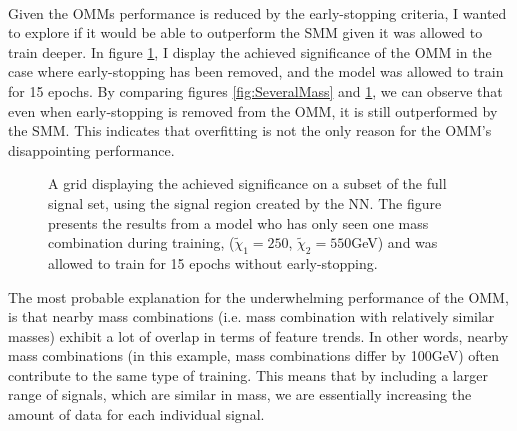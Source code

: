 \\
Given the \ac{OMM}s performance is reduced by the early-stopping criteria, I wanted to explore if it would be able to outperform the 
\ac{SMM} given it was allowed to train deeper. In figure \ref{fig:NNOverfitting}, I display the achieved significance
of the \ac{OMM} in the case where early-stopping has been removed, and the model was allowed to train for 15 epochs. By comparing figures 
\ref{fig:SeveralMass} and \ref{fig:NNOverfitting}, we can observe that even when early-stopping is removed from the \ac{OMM}, it is  
still outperformed by the \ac{SMM}. This indicates that overfitting is not the only reason for the \ac{OMM}'s disappointing performance.\\
\begin{figure}
    \centering
    \caption{A grid displaying the achieved significance on a subset of the full signal set, using the signal region 
    created by the \ac{NN}. The figure presents the results from a model who has only seen one mass combination 
    during training, ($\tilde{\chi}_1=250$, $\tilde{\chi}_2=550$GeV) and was allowed to train for 15 epochs without 
    early-stopping.}
    \label{fig:NNOverfitting}
\end{figure}
The most probable explanation for the underwhelming performance of the \ac{OMM}, is that nearby mass combinations (i.e. mass combination with 
relatively similar masses) exhibit a lot of overlap in terms of feature trends. In other words, nearby mass combinations (in this example, mass combinations 
differ by 100GeV) often contribute to the same type of training. This means that by including a larger range of signals, which are similar in mass, we are 
essentially increasing the amount of data for each individual signal.